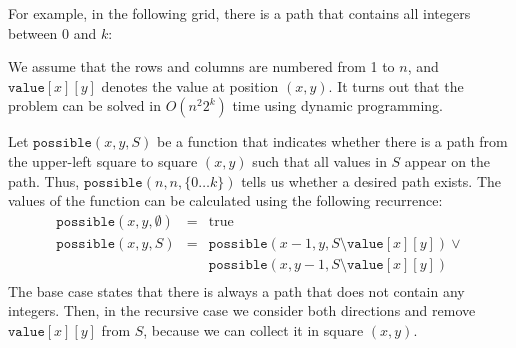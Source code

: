 For example, in the following grid,
there is a path that contains all
integers between 0 and $k$:
\begin{center}
\end{center}

We assume that the rows and columns are numbered
from 1 to $n$, and $\texttt{value}[x][y]$
denotes the value at position $(x,y)$.
It turns out that the problem can be solved in $O(n^2 2^k)$ time
using dynamic programming.

Let $\texttt{possible}(x,y,S)$ be a function
that indicates whether there is a path
from the upper-left square to square $(x,y)$ such that
all values in $S$ appear on the path.
Thus, $\texttt{possible}(n,n,\{0 \ldots k\})$
tells us whether a desired path exists.
The values of the function can be calculated using
the following recurrence:
\begin{equation*}
\begin{aligned}
\texttt{possible}(x,y,\emptyset) & = & \textrm{true} \\
\texttt{possible}(x,y,S) & = & \texttt{possible}(x-1,y,S \setminus \texttt{value}[x][y]) \lor \\
                    &  & \texttt{possible}(x,y-1,S \setminus \texttt{value}[x][y]) \\
\end{aligned}
\end{equation*}
The base case states that there is always a path that
does not contain any integers.
Then, in the recursive case we consider both directions
and remove $\texttt{value}[x][y]$
from $S$, because we can collect it in square $(x,y)$.

